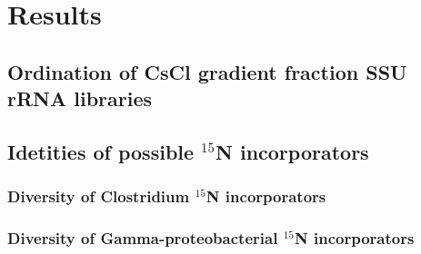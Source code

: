 \section{Results}

\subsection{Ordination of CsCl gradient fraction SSU rRNA libraries}
\subsection{Idetities of possible $^{15}$N incorporators}
\subsubsection{Diversity of Clostridium $^{15}$N incorporators}
\subsubsection{Diversity of Gamma-proteobacterial $^{15}$N incorporators}



